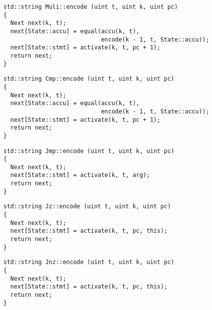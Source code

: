 
\newpage

\begin{lstlisting}[style=c++, style=encode]
std::string Muli::encode (uint t, uint k, uint pc)
{
  Next next(k, t);
  next[State::accu] = equal(accu(k, t),
                            encode(k - 1, t, State::accu));
  next[State::stmt] = activate(k, t, pc + 1);
  return next;
}
\end{lstlisting}


\begin{lstlisting}[style=c++, style=encode]
std::string Cmp::encode (uint t, uint k, uint pc)
{
  Next next(k, t);
  next[State::accu] = equal(accu(k, t),
                            encode(k - 1, t, State::accu));
  next[State::stmt] = activate(k, t, pc + 1);
  return next;
}
\end{lstlisting}


\begin{lstlisting}[style=c++, style=encode]
std::string Jmp::encode (uint t, uint k, uint pc)
{
  Next next(k, t);
  next[State::stmt] = activate(k, t, arg);
  return next;
}
\end{lstlisting}


\begin{lstlisting}[style=c++, style=encode]
std::string Jz::encode (uint t, uint k, uint pc)
{
  Next next(k, t);
  next[State::stmt] = activate(k, t, pc, this);
  return next;
}
\end{lstlisting}


\newpage

\begin{lstlisting}[style=c++, style=encode]
std::string Jnz::encode (uint t, uint k, uint pc)
{
  Next next(k, t);
  next[State::stmt] = activate(k, t, pc, this);
  return next;
}
\end{lstlisting}

